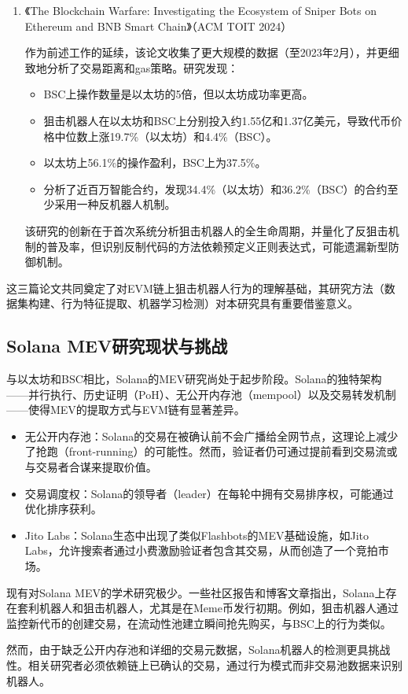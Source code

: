 \begin{enumerate}
    \item 《The Blockchain Warfare: Investigating the Ecosystem of Sniper Bots on Ethereum and BNB Smart Chain》（ACM TOIT 2024）
    \par 作为前述工作的延续，该论文收集了更大规模的数据（至2023年2月），并更细致地分析了交易距离和gas策略。研究发现：
	\begin{itemize}
  	    \item BSC上操作数量是以太坊的5倍，但以太坊成功率更高。
	    \item 狙击机器人在以太坊和BSC上分别投入约1.55亿和1.37亿美元，导致代币价格中位数上涨19.7\%（以太坊）和4.4\%（BSC）。
             \item 以太坊上56.1\%的操作盈利，BSC上为37.5\%。
             \item 分析了近百万智能合约，发现34.4\%（以太坊）和36.2\%（BSC）的合约至少采用一种反机器人机制。
	\end{itemize}
    \par 该研究的创新在于首次系统分析狙击机器人的全生命周期，并量化了反狙击机制的普及率，但识别反制代码的方法依赖预定义正则表达式，可能遗漏新型防御机制。
\end{enumerate}
\par 这三篇论文共同奠定了对EVM链上狙击机器人行为的理解基础，其研究方法（数据集构建、行为特征提取、机器学习检测）对本研究具有重要借鉴意义。

\subsection{Solana MEV研究现状与挑战}

\par 与以太坊和BSC相比，Solana的MEV研究尚处于起步阶段。Solana的独特架构——并行执行、历史证明（PoH）、无公开内存池（mempool）以及交易转发机制——使得MEV的提取方式与EVM链有显著差异。
\begin{itemize}
    \item 无公开内存池：Solana的交易在被确认前不会广播给全网节点，这理论上减少了抢跑（front-running）的可能性。然而，验证者仍可通过提前看到交易流或与交易者合谋来提取价值。
    \item 交易调度权：Solana的领导者（leader）在每轮中拥有交易排序权，可能通过优化排序获利。
    \item Jito Labs：Solana生态中出现了类似Flashbots的MEV基础设施，如Jito Labs，允许搜索者通过小费激励验证者包含其交易，从而创造了一个竞拍市场。
\end{itemize}
\par 现有对Solana MEV的学术研究极少。一些社区报告和博客文章指出，Solana上存在套利机器人和狙击机器人，尤其是在Meme币发行初期。例如，狙击机器人通过监控新代币的创建交易，在流动性池建立瞬间抢先购买，与BSC上的行为类似。
\par 然而，由于缺乏公开内存池和详细的交易元数据，Solana机器人的检测更具挑战性。相关研究者必须依赖链上已确认的交易，通过行为模式而非交易池数据来识别机器人。

